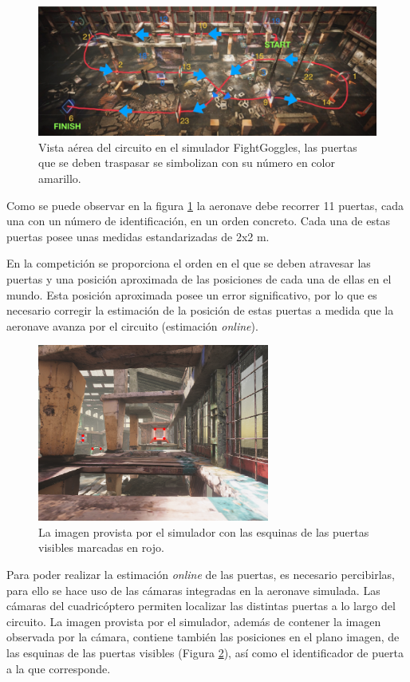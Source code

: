 \begin{figure}[htb!]
	\centering
	\includegraphics[width=\textwidth]{imagenes/diagramacircuito}
	\caption{Vista aérea del circuito en el simulador FightGoggles, las puertas que se deben traspasar se simbolizan con su número en color amarillo.}
	\label{waypoints:circuito}
\end{figure}

Como se puede observar en la figura \ref{waypoints:circuito} la aeronave debe recorrer 11 puertas, cada una con un número de identificación, en un orden concreto. Cada una de estas puertas posee unas medidas estandarizadas de 2x2 m.

En la competición se proporciona el orden en el que se deben atravesar las puertas y una posición aproximada de las posiciones de cada una de ellas en el mundo. Esta posición aproximada posee un error significativo, por lo que es necesario corregir la estimación de la posición de estas puertas a medida que la aeronave avanza por el circuito (estimación \textit{online}).
\begin{figure}[htb!]
	\centering
	\includegraphics[width=0.68\textwidth]{imagenes/red_points}
	\caption{La imagen provista por el simulador con las esquinas de las puertas visibles marcadas en rojo.}
	\label{redpoints}
\end{figure}


Para poder realizar la estimación \textit{online} de las puertas, es necesario percibirlas, para ello se hace uso de las cámaras integradas en la aeronave simulada. Las cámaras del cuadricóptero permiten localizar las distintas puertas a lo largo del circuito. La imagen provista por el simulador, además de contener la imagen observada por la cámara, contiene también las posiciones en el plano imagen, de las esquinas de las puertas visibles (Figura \ref{redpoints}), así como el identificador de puerta a la que corresponde.




